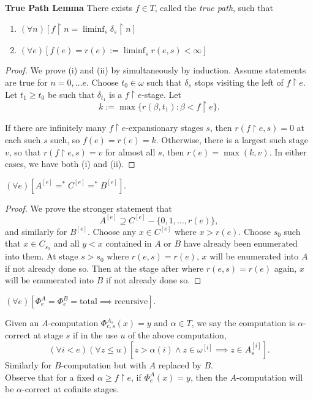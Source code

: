   \begin{lemma}
    \textbf{True Path Lemma} There exists $f\in T$, called the \textit{true
    path}, such that
    \begin{enumerate}[label=(\roman*)]
      \item $(\forall n) [f\restriction n =\liminf_s \delta_s\restriction
        n]$
      \item $(\forall e) [f(e) =r(e) :=\liminf_s r(e,s) <\infty]$
    \end{enumerate}
  \end{lemma}
  \begin{proof}
    We prove (i) and (ii) by simultaneously by induction. Assume statements
    are true for $n=0,\ldots e$. Choose $t_0\in\omega$ such that $\delta_s$
    stops visiting the left of $f\restriction e$. Let $t_1\geq t_0$ be such
    that $\delta_{t_1}$ is a $f\restriction e$-stage. Let
    \[k :=\max\{r(\beta, t_1): \beta<f\restriction e\}.\]

    If there are infinitely many $f\restriction e$-expansionary stages $s$,
    then $r(f\restriction e,s)=0$ at each such $s$ such, so $f(e)=r(e)=k$.
    Otherwise, there is a largest such stage $v$, so that $r(f\restriction
    e,s)=v$ for almost all $s$, then $r(e)=\max(k,v)$. In either cases, we
    have both (i) and (ii).
  \end{proof}

  \begin{lemma}
    $(\forall e) [A^{[e]}=^*C^{[e]}=^*B^{[e]}]$.
  \end{lemma}
  \begin{proof}
    We prove the stronger statement that
    \[A^{[e]}\supseteq C^{[e]}-\{0,1,\ldots,r(e)\},\]
    and similarly for $B^{[e]}$. Choose any $x\in C^{[e]}$ where $x>r(e)$.
    Choose $s_0$ such that $x\in C_{s_0}$ and all $y<x$ contained in $A$ or
    $B$ have already been enumerated into them. At stage $s>s_0$ where
    $r(e,s)=r(e)$, $x$ will be enumerated into $A$ if not already done so.
    Then at the stage after where $r(e,s)=r(e)$ again, $x$ will be
    enumerated into $B$ if not already done so.
  \end{proof}

  \begin{lemma}
    $(\forall e)[\Phi_e^A=\Phi_e^B=\text{total} \implies\text{recursive}]$.
  \end{lemma}

  \begin{notation}
    Given an $A$-computation $\Phi_{e,s}^{A_s}(x)=y$ and $\alpha\in T$, we
    say the computation is $\alpha$-correct at stage $s$ if in the use $u$ of
    the above computation,
    \[(\forall i<e)(\forall z\leq u) [z>\alpha(i) \wedge z\in \omega^{[i]}
    \implies z\in A_s^{[i]}].\]
    Similarly for $B$-computation but with $A$ replaced by $B$. \\

    Observe that for a fixed $\alpha\geq f\restriction e$, if
    $\Phi_e^A(x)=y$, then the $A$-computation will be $\alpha$-correct at
    cofinite stages.
  \end{notation}


